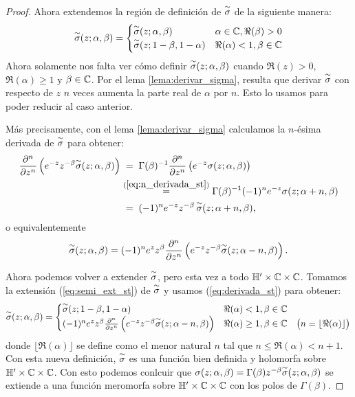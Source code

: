\documentclass[../../tesis_maestria]{subfiles}
\begin{document}
\begin{proof}
Ahora extendemos la regi\'on de definici\'on de $\overset{\sim}{\sigma}$ de la siguiente manera:
\begin{equation}\label{eq:semi_ext_st}
  \overset{\sim}{\sigma}(z;\alpha,\beta)=
  \begin{cases}
    \overset{\sim}{\sigma}(z;\alpha,\beta) & \alpha\in\mathbb{C},\Re(\beta)>0\\
    \overset{\sim}{\sigma}(z;1-\beta,1-\alpha) & \Re(\alpha)<1,\beta\in\mathbb{C}
  \end{cases}
\end{equation}
Ahora solamente nos falta ver c\'omo definir $\overset{\sim}{\sigma}(z;\alpha,\beta)$ cuando $\Re(z)>0$,
$\Re(\alpha)\geq1$ y $\beta\in\mathbb{C}$. Por el lema \ref{lema:derivar_sigma}, resulta que derivar
$\overset{\sim}{\sigma}$ con respecto de $z$ $n$ veces aumenta la parte real de $\alpha$ por $n$. Esto  lo usamos
para poder reducir al caso anterior.

M\'as precisamente, con el lema \ref{lema:derivar_sigma} calculamos la $n$-\'esima derivada de
$\overset{\sim}{\sigma}$ para obtener:
\begin{align*}
  \frac{\partial^n}{\partial z^n}\left( e^{-z}z^{-\beta}\overset{\sim}{\sigma}(z;\alpha,\beta) \right)
  &\;=\;\Gamma(\beta)^{-1}\frac{\partial^n}{\partial z^n}\left( e^{-z}\sigma(z;\alpha,\beta) \right)\\
  &\overset{(\ref{eq:n_derivada_st})}{=}\Gamma(\beta)^{-1}(-1)^ne^{-z}\sigma(z;\alpha+n,\beta)\\
  &\;=\;(-1)^ne^{-z}z^{-\beta}\,\overset{\sim}{\sigma}(z;\alpha+n,\beta),
\end{align*}
o equivalentemente
\begin{equation}\label{eq:derivada_st}
  \overset{\sim}{\sigma}(z;\alpha,\beta)=
  (-1)^ne^zz^{\beta}\frac{\partial^n}{\partial z^n}\left( e^{-z}z^{-\beta}\overset{\sim}{\sigma}(z;\alpha-n,\beta) \right).
\end{equation}

Ahora podemos volver a extender $\overset{\sim}{\sigma}$, pero esta vez a todo $\mathbb{H}'\times\mathbb{C}\times\mathbb{C}$. Tomamos la
extensi\'on (\ref{eq:semi_ext_st}) de $\overset{\sim}{\sigma}$ y usamos (\ref{eq:derivada_st}) para obtener:
\[
   \overset{\sim}{\sigma}(z;\alpha,\beta)=
  \begin{cases}
    \overset{\sim}{\sigma}(z;1-\beta,1-\alpha) & \Re(\alpha)<1,\beta\in\mathbb{C}\\
    (-1)^ne^zz^{\beta}\frac{\partial^n}{\partial z^n}\left( e^{-z}z^{-\beta}\overset{\sim}{\sigma}(z;\alpha-n,\beta) \right)
    & \Re(\alpha)\geq 1,\beta\in\mathbb{C}\quad\big(n=\lfloor\Re(\alpha)\rfloor\big)
  \end{cases}
\]
donde $\lfloor\Re(\alpha)\rfloor$ se define como el menor natural $n$ tal que
$n\leq \Re(\alpha)<n+1$. Con esta nueva definici\'on, $\overset{\sim}{\sigma}$ es una funci\'on bien definida
y holomorfa sobre $\mathbb{H}'\times\mathbb{C}\times\mathbb{C}$. Con esto podemos conlcuir que
$\sigma(z;\alpha,\beta)=\Gamma(\beta)z^{-\beta}\overset{\sim}{\sigma}(z;\alpha,\beta)$ se extiende a una funci\'on
meromorfa sobre $\mathbb{H}'\times\mathbb{C}\times\mathbb{C}$ con los polos de $\Gamma(\beta)$.
\end{proof}
\end{document}
